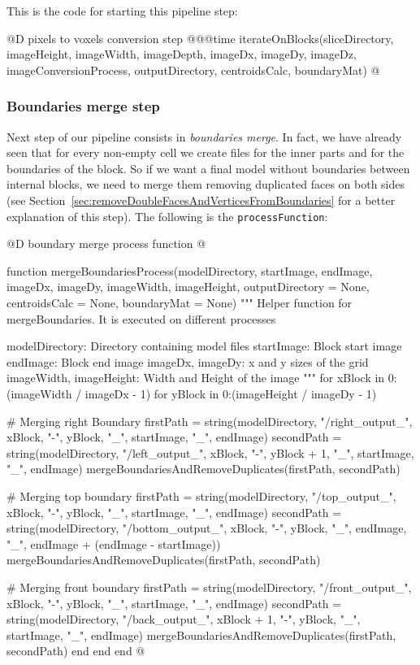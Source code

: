 \documentclass[11pt,oneside]{article}	%
\begin{document}
This is the code for starting this pipeline step:

@D pixels to voxels conversion step
@{@@time iterateOnBlocks(sliceDirectory,
                  imageHeight, imageWidth, imageDepth,
                  imageDx, imageDy, imageDz,
                  imageConversionProcess, outputDirectory,
                  centroidsCalc, boundaryMat) @}
                  
\subsubsection{Boundaries merge step}\label{sec:boundariesStep}
Next step of our pipeline consists in \textit{boundaries merge}. In fact, we have already seen that for every non-empty cell we create files for the inner parts and for the boundaries of the block. So if we want a final model without boundaries between internal blocks, we need to merge them removing duplicated faces on both sides (see Section~\ref{sec:removeDoubleFacesAndVerticesFromBoundaries} for a better explanation of this step). The following is the \texttt{processFunction}:

@D boundary merge process function
@{function mergeBoundariesProcess(modelDirectory,
				  startImage, endImage,
				  imageDx, imageDy,
				  imageWidth, imageHeight,
				  outputDirectory = None,
				  centroidsCalc = None, boundaryMat = None)
  """
  Helper function for mergeBoundaries.
  It is executed on different processes

  modelDirectory: Directory containing model files
  startImage: Block start image
  endImage: Block end image
  imageDx, imageDy: x and y sizes of the grid
  imageWidth, imageHeight: Width and Height of the image
  """
  for xBlock in 0:(imageWidth / imageDx - 1)
    for yBlock in 0:(imageHeight / imageDy - 1)

      # Merging right Boundary
      firstPath = string(modelDirectory, "/right_output_", xBlock, "-", yBlock,
			"_", startImage, "_", endImage)
      secondPath = string(modelDirectory, "/left_output_", xBlock, "-", yBlock + 1,
			"_", startImage, "_", endImage)
      mergeBoundariesAndRemoveDuplicates(firstPath, secondPath)

      # Merging top boundary
      firstPath = string(modelDirectory, "/top_output_", xBlock, "-", yBlock,
			 "_", startImage, "_", endImage)
      secondPath = string(modelDirectory, "/bottom_output_", xBlock, "-", yBlock,
			 "_", endImage, "_", endImage + (endImage - startImage))
      mergeBoundariesAndRemoveDuplicates(firstPath, secondPath)

      # Merging front boundary
      firstPath = string(modelDirectory, "/front_output_", xBlock, "-", yBlock,
			"_", startImage, "_", endImage)
      secondPath = string(modelDirectory, "/back_output_", xBlock + 1, "-", yBlock,
			"_", startImage, "_", endImage)
      mergeBoundariesAndRemoveDuplicates(firstPath, secondPath)
    end
  end
end @}
\end{document}
